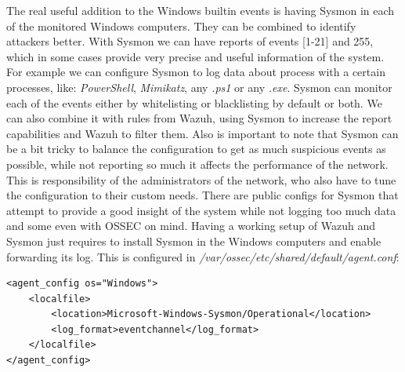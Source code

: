 \linej
The real useful addition to the Windows builtin events is having Sysmon\cite{sysmon} in each of the monitored Windows computers. They can be combined to identify attackers better\cite{detection_events}.
\linej
With Sysmon we can have reports of events [1-21] and 255, which in some cases provide very precise and useful information of the system. For example we can configure Sysmon to log data about process with a certain processes, like: \textit{PowerShell}, \textit{Mimikatz}, any \textit{.ps1} or any \textit{.exe}.
Sysmon can monitor each of the events either by whitelisting or blacklisting by default or both. We can also combine it with rules from Wazuh, using Sysmon to increase the report capabilities and Wazuh to filter them.
\linej
\linej
Also is important to note that Sysmon can be a bit tricky to balance the configuration to get as much suspicious events as possible, while not reporting so much it affects the performance of the network. This is responsibility of the administrators of the network, who also have to tune the configuration to their custom needs.
There are public configs for Sysmon that attempt to provide a good insight of the system while not logging too much data\cite{sysmon_config} and some even with OSSEC on mind\cite{ossec_sysmon}.
\linej
\linej
Having a working setup of Wazuh and Sysmon just requires to install Sysmon in the Windows computers and enable forwarding its log. This is configured in \textit{/var/ossec/etc/shared/default/agent.conf}:
\begin{lstlisting}[style=xml]
<agent_config os="Windows">
	<localfile>
		<location>Microsoft-Windows-Sysmon/Operational</location>
		<log_format>eventchannel</log_format>
	</localfile>
</agent_config>
\end{lstlisting}

